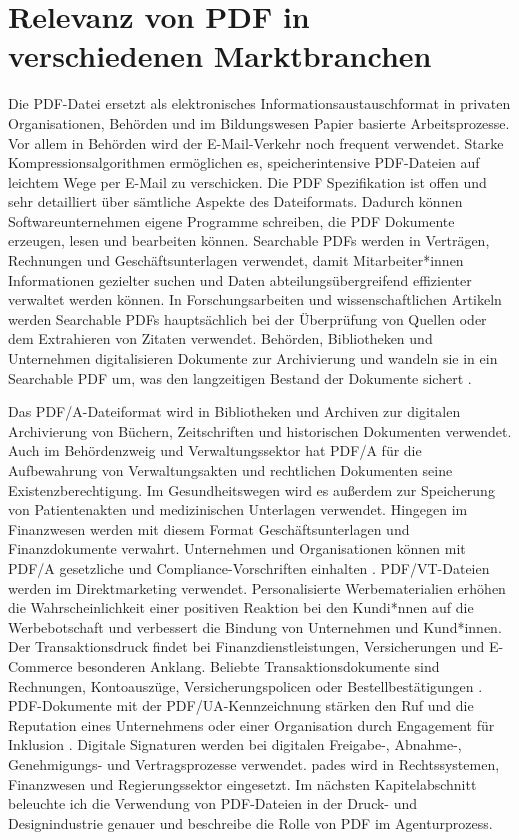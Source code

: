 \section{Relevanz von PDF in verschiedenen Marktbranchen}
Die PDF-Datei ersetzt als elektronisches Informationsaustauschformat in privaten Organisationen, Behörden und im Bildungswesen Papier basierte Arbeitsprozesse. Vor allem in Behörden wird der E-Mail-Verkehr noch frequent verwendet. Starke Kompressionsalgorithmen ermöglichen es, speicherintensive PDF-Dateien auf leichtem Wege per E-Mail zu verschicken. Die PDF Spezifikation ist offen und sehr detailliert über sämtliche Aspekte des Dateiformats. Dadurch können Softwareunternehmen eigene Programme schreiben, die PDF Dokumente erzeugen, lesen und bearbeiten können. Searchable PDFs werden in Verträgen, Rechnungen und Geschäftsunterlagen verwendet, damit Mitarbeiter*innen Informationen gezielter suchen und Daten abteilungsübergreifend effizienter verwaltet werden können. In Forschungsarbeiten und wissenschaftlichen Artikeln werden Searchable PDFs hauptsächlich bei der Überprüfung von Quellen oder dem Extrahieren von Zitaten verwendet. Behörden, Bibliotheken und Unternehmen digitalisieren Dokumente zur Archivierung und wandeln sie in ein Searchable PDF um, was den langzeitigen Bestand der Dokumente sichert \cite{adobe-search}.
\par
Das PDF/A-Dateiformat wird in Bibliotheken und Archiven zur digitalen Archivierung von Büchern, Zeitschriften und historischen Dokumenten verwendet. Auch im Behördenzweig und Verwaltungssektor hat PDF/A für die Aufbewahrung von Verwaltungsakten und rechtlichen Dokumenten seine Existenzberechtigung. Im Gesundheitswegen wird es außerdem zur Speicherung von Patientenakten und medizinischen Unterlagen verwendet. Hingegen im Finanzwesen werden mit diesem Format Geschäftsunterlagen und Finanzdokumente verwahrt. Unternehmen und Organisationen können mit PDF/A gesetzliche und Compliance-Vorschriften einhalten \cite{adobe-pdf-a}. PDF/VT-Dateien werden im Direktmarketing verwendet. Personalisierte Werbematerialien erhöhen die Wahrscheinlichkeit einer positiven Reaktion bei den Kundi*nnen auf die Werbebotschaft und verbessert die Bindung von Unternehmen und Kund*innen. Der Transaktionsdruck findet bei Finanzdienstleistungen, Versicherungen und E-Commerce besonderen Anklang. Beliebte Transaktionsdokumente sind Rechnungen, Kontoauszüge, Versicherungspolicen oder Bestellbestätigungen \cite{adobe-pdf-vt}. PDF-Dokumente mit der PDF/UA-Kennzeichnung stärken den Ruf und die Reputation eines Unternehmens oder einer Organisation durch Engagement für Inklusion \cite{adobe-pdf-ua}. Digitale Signaturen werden bei digitalen Freigabe-, Abnahme-, Genehmigungs- und Vertragsprozesse verwendet. \gls{pades} wird in Rechtssystemen, Finanzwesen und Regierungssektor eingesetzt\cite{adobe-pdf-pades}. Im nächsten Kapitelabschnitt beleuchte ich die Verwendung von PDF-Dateien in der Druck- und Designindustrie genauer und beschreibe die Rolle von PDF im Agenturprozess.  